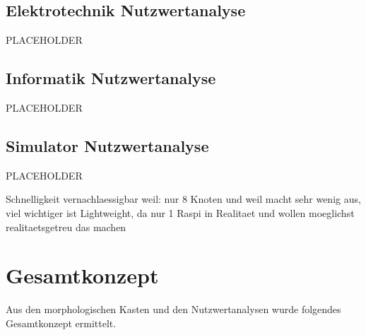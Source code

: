 \subsection{Elektrotechnik Nutzwertanalyse}

PLACEHOLDER

\subsection{Informatik Nutzwertanalyse}

PLACEHOLDER

\subsection{Simulator Nutzwertanalyse}

PLACEHOLDER

Schnelligkeit vernachlaessigbar weil: nur 8 Knoten und weil macht sehr wenig aus, viel wichtiger ist Lightweight, da nur 1 Raspi in Realitaet und wollen moeglichst realitaetsgetreu das machen

\newpage
\section{Gesamtkonzept}

Aus den morphologischen Kasten und den Nutzwertanalysen wurde folgendes Gesamtkonzept ermittelt. 

